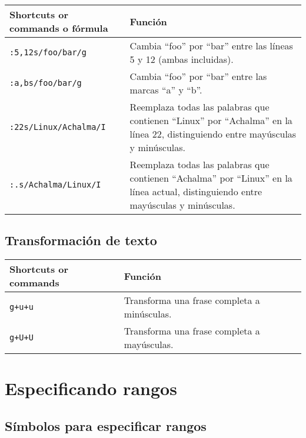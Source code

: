 \documentclass[
  doc,
  floatsintext,
  longtable,
  a4paper,
  nolmodern,
  notxfonts,
  notimes,
  colorlinks=true,linkcolor=blue,citecolor=blue,urlcolor=blue]{apa7}
\begin{document}
\begin{longtable}[]{@{}
  >{\raggedright\arraybackslash}p{}
  >{\raggedright\arraybackslash}p{}@{}}
\toprule\noalign{}
\begin{minipage}[b]{\linewidth}\raggedright
Shortcuts or commands o fórmula
\end{minipage} & \begin{minipage}[b]{\linewidth}\raggedright
Función
\end{minipage} \\
\midrule\noalign{}
\endhead
\bottomrule\noalign{}
\endlastfoot
\texttt{:5,12s/foo/bar/g} & Cambia ``foo'' por ``bar'' entre las líneas
5 y 12 (ambas incluidas). \\
\texttt{:\textquotesingle{}a,\textquotesingle{}bs/foo/bar/g} & Cambia
``foo'' por ``bar'' entre las marcas ``a'' y ``b''. \\
\texttt{:22s/Linux/Achalma/I} & Reemplaza todas las palabras que
contienen ``Linux'' por ``Achalma'' en la línea 22, distinguiendo entre
mayúsculas y minúsculas. \\
\texttt{:.s/Achalma/Linux/I} & Reemplaza todas las palabras que
contienen ``Achalma'' por ``Linux'' en la línea actual, distinguiendo
entre mayúsculas y minúsculas. \\
\end{longtable}

\subsection{Transformación de texto}\label{transformaciuxf3n-de-texto}

\begin{longtable}[]{@{}ll@{}}
\toprule\noalign{}
Shortcuts or commands & Función \\
\midrule\noalign{}
\endhead
\bottomrule\noalign{}
\endlastfoot
\texttt{g+u+u} & Transforma una frase completa a minúsculas. \\
\texttt{g+U+U} & Transforma una frase completa a mayúsculas. \\
\end{longtable}

\section{Especificando rangos}\label{especificando-rangos}

\subsection{Símbolos para especificar
rangos}\label{suxedmbolos-para-especificar-rangos}
\end{document}
